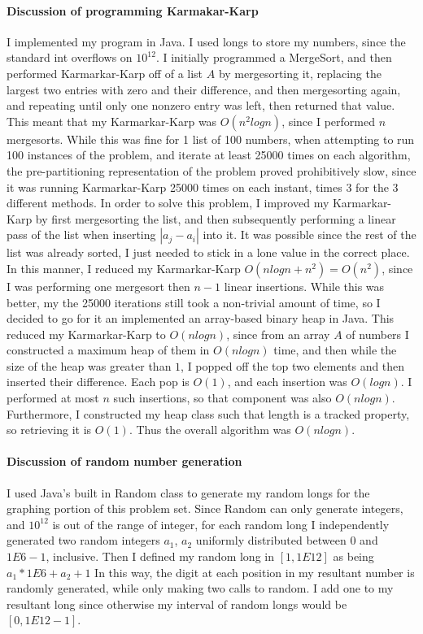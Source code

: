\documentclass[10.5pt,letter]{article}
\begin{document}
\paragraph{Discussion of programming Karmakar-Karp} I implemented my program in Java. I used longs to store my numbers, since the standard int overflows on $10^12$. I initially programmed a MergeSort, and then performed Karmarkar-Karp off of a list $A$ by mergesorting it, replacing the largest two entries with zero and their difference, and then mergesorting again, and repeating until only one nonzero entry was left, then returned that value. This meant that my Karmarkar-Karp was $O(n^2logn)$, since I performed $n$ mergesorts. While this was fine for 1 list of 100 numbers, when attempting to run 100 instances of the problem, and iterate at least 25000 times on each algorithm, the pre-partitioning representation of the problem proved prohibitively slow, since it was running Karmarkar-Karp 25000 times on each instant,  times 3 for the 3 different methods. In order to solve this problem, I improved my Karmarkar-Karp by first mergesorting the list, and then subsequently performing a linear pass of the list when inserting $|a_j-a_i|$ into it. It was possible since the rest of the list was already sorted, I just needed to stick in a lone value in the correct place. In this manner, I reduced my Karmarkar-Karp $O(nlogn + n^2) = O(n^2)$, since I was performing one mergesort then $n-1$ linear insertions. While this was better, my the 25000 iterations still took a non-trivial amount of time, so I decided to go for it an implemented an array-based binary heap in Java. This reduced my Karmarkar-Karp to $O(nlogn)$, since from an array $A$ of numbers I constructed a maximum heap of them in $O(nlogn)$ time, and then while the size of the heap was greater than $1$, I popped off the top two elements and then inserted their difference. Each pop is $O(1)$, and each insertion was $O(logn)$. I performed at most $n$ such insertions, so that component was also $O(nlogn)$. Furthermore, I constructed my heap class such that length is a tracked property, so retrieving it is $O(1)$. Thus the overall algorithm was $O(nlogn)$. 

\paragraph{Discussion of random number generation} I used Java's built in Random class to generate my random longs for the graphing portion of this problem set. Since Random can only generate integers, and $10^12$ is out of the range of integer, for each random long I independently generated two random integers $a_1$, $a_2$ uniformly distributed between $0$ and $1E6- 1$, inclusive. Then I defined my random long in $[1, 1E12]$ as being $a_1*1E6 + a_2 + 1$ In this way, the digit at each position in my resultant number is randomly generated, while only making two calls to random. I add one to my resultant long since otherwise my interval of random longs would be $[0, 1E12 -1]$. 
\end{document}
